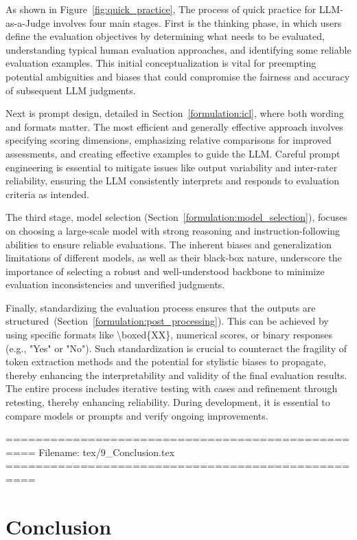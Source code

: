 As shown in Figure~\ref{fig:quick_practice}, The process of quick practice for LLM-as-a-Judge involves four main stages.
First is the thinking phase, in which users define the evaluation objectives by determining what needs to be evaluated, understanding typical human evaluation approaches, and identifying some reliable evaluation examples. This initial conceptualization is vital for preempting potential ambiguities and biases that could compromise the fairness and accuracy of subsequent LLM judgments.

Next is prompt design, detailed in Section~\ref{formulation:icl}, where both wording and formats matter. The most efficient and generally effective approach involves specifying scoring dimensions, emphasizing relative comparisons for improved assessments, and creating effective examples to guide the LLM. Careful prompt engineering is essential to mitigate issues like output variability and inter-rater reliability, ensuring the LLM consistently interprets and responds to evaluation criteria as intended.

The third stage, model selection (Section~\ref{formulation:model_selection}), focuses on choosing a large-scale model with strong reasoning and instruction-following abilities to ensure reliable evaluations. The inherent biases and generalization limitations of different models, as well as their black-box nature, underscore the importance of selecting a robust and well-understood backbone to minimize evaluation inconsistencies and unverified judgments.

Finally, standardizing the evaluation process ensures that the outputs are structured~(Section~\ref{formulation:post_processing}). This can be achieved by using specific formats like \textbackslash{boxed\{XX\}}, numerical scores, or binary responses (e.g., "Yes" or "No"). Such standardization is crucial to counteract the fragility of token extraction methods and the potential for stylistic biases to propagate, thereby enhancing the interpretability and validity of the final evaluation results. The entire process includes iterative testing with cases and refinement through retesting, thereby enhancing reliability. During development, it is essential to compare models or prompts and verify ongoing improvements.





==================================================
Filename: tex/9_Conclusion.tex
==================================================
\section{Conclusion}\label{sec:conclusion}


